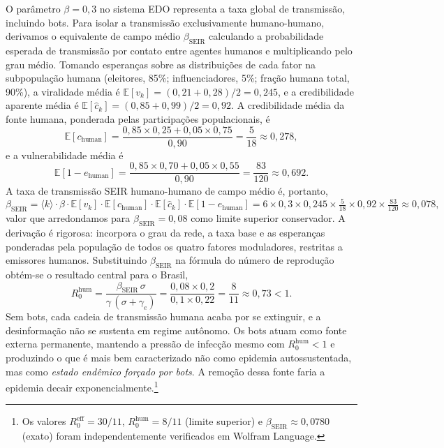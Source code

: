 \documentclass[12pt,a4paper]{article}
\theoremstyle{definition}
\theoremstyle{plain}
\begin{document}
O parâmetro $\beta = 0{,}3$ no sistema EDO representa a taxa global de transmissão, incluindo bots. Para isolar a transmissão exclusivamente humano-humano, derivamos o equivalente de campo médio $\beta_{\text{SEIR}}$ calculando a probabilidade esperada de transmissão por contato entre agentes humanos e multiplicando pelo grau médio. Tomando esperanças sobre as distribuições de cada fator na subpopulação humana (eleitores, 85\%; influenciadores, 5\%; fração humana total, 90\%), a viralidade média é $\mathbb{E}[v_k] = (0{,}21 + 0{,}28)/2 = 0{,}245$, e a credibilidade aparente média é $\mathbb{E}[\hat{c}_k] = (0{,}85 + 0{,}99)/2 = 0{,}92$. A credibilidade média da fonte humana, ponderada pelas participações populacionais, é
\begin{equation}
\mathbb{E}[c_{\text{human}}] = \frac{0{,}85 \times 0{,}25 + 0{,}05 \times 0{,}75}{0{,}90} = \frac{5}{18} \approx 0{,}278,
\label{eq:Echuman}
\end{equation}
e a vulnerabilidade média é
\begin{equation}
\mathbb{E}[1 - e_{\text{human}}] = \frac{0{,}85 \times 0{,}70 + 0{,}05 \times 0{,}55}{0{,}90} = \frac{83}{120} \approx 0{,}692.
\label{eq:Evuln}
\end{equation}
A taxa de transmissão SEIR humano-humano de campo médio é, portanto,
\begin{equation}
\beta_{\text{SEIR}} = \langle k \rangle \cdot \beta \cdot \mathbb{E}[v_k] \cdot \mathbb{E}[c_{\text{human}}] \cdot \mathbb{E}[\hat{c}_k] \cdot \mathbb{E}[1-e_{\text{human}}] = 6 \times 0{,}3 \times 0{,}245 \times \tfrac{5}{18} \times 0{,}92 \times \tfrac{83}{120} \approx 0{,}078,
\label{eq:betaSEIR}
\end{equation}
valor que arredondamos para $\beta_{\text{SEIR}} = 0{,}08$ como limite superior conservador. A derivação é rigorosa: incorpora o grau da rede, a taxa base e as esperanças ponderadas pela população de todos os quatro fatores moduladores, restritas a emissores humanos. Substituindo $\beta_{\text{SEIR}}$ na fórmula do número de reprodução obtém-se o resultado central para o Brasil,
\begin{equation}
R_0^{\text{hum}} = \frac{\beta_{\text{SEIR}}\,\sigma}{\gamma\,(\sigma + \gamma_e)} = \frac{0{,}08 \times 0{,}2}{0{,}1 \times 0{,}22} = \frac{8}{11} \approx 0{,}73 < 1.
\label{eq:R0hum}
\end{equation}
Sem bots, cada cadeia de transmissão humana acaba por se extinguir, e a desinformação não se sustenta em regime autônomo. Os bots atuam como fonte externa permanente, mantendo a pressão de infecção mesmo com $R_0^{\text{hum}} < 1$ e produzindo o que é mais bem caracterizado não como epidemia autossustentada, mas como \emph{estado endêmico forçado por bots}. A remoção dessa fonte faria a epidemia decair exponencialmente.\footnote{Os valores $R_0^{\text{eff}} = 30/11$, $R_0^{\text{hum}} = 8/11$ (limite superior) e $\beta_{\text{SEIR}} \approx 0{,}0780$ (exato) foram independentemente verificados em Wolfram Language.}
\end{document}
